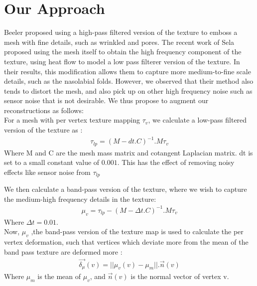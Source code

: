 \section{Our Approach}

Beeler \etal \cite{beeler2010high} proposed using a high-pass filtered version of the texture to emboss a mesh with fine details, such as wrinkled and pores. The recent work of Sela \etal \cite{sela2017unrestricted} proposed using the mesh itself to obtain the high frequency component of the texture, using heat flow to model a low pass filterer version of the texture. In their results, this modification allows them to capture more medium-to-fine scale details, such as the nasolabial folds. However, we observed that their method also tends to distort the mesh, and also pick up on other high frequency noise such as sensor noise that is not desirable. We thus propose to augment our reconstructions as follows: \\
For a mesh with per vertex texture mapping $\tau_{v}$, we calculate a low-pass filtered version of the texture as :
\begin{align}
\tau_{lp} = (M-dt.C)^{-1}.M\tau_{v}
 \label{eqn:mesoscopic}
\end{align}
Where M and C are the mesh mass matrix and cotangent Laplacian matrix. dt is set to a small constant value of $0.001$. This has the effect of removing noisy effects like sensor noise from $\tau_{lp}$

We then calculate a band-pass version of the texture, where we wish to capture the medium-high frequency details in the texture:
\begin{align}
\mu_{v} = \tau_{lp} - (M-\Delta t.C)^{-1}.M\tau_{v}
 \label{eqn:mesoscopic}
\end{align}
Where $\Delta t = 0.01$. \\
Now, $\mu_{v}$ ,the band-pass version of the texture map is used to calculate the per vertex deformation, such that vertices which deviate more from the mean of the band pass texture are deformed more :
\begin{align}
\vec{\delta_{\mu}}(v)= || \mu_{v}(v) - \mu_{m} ||.\vec{n}(v)
\end{align}
Where $\mu_{m}$ is the mean of $\mu_{v}$, and $\vec{n}(v)$ is the normal vector of vertex v.

